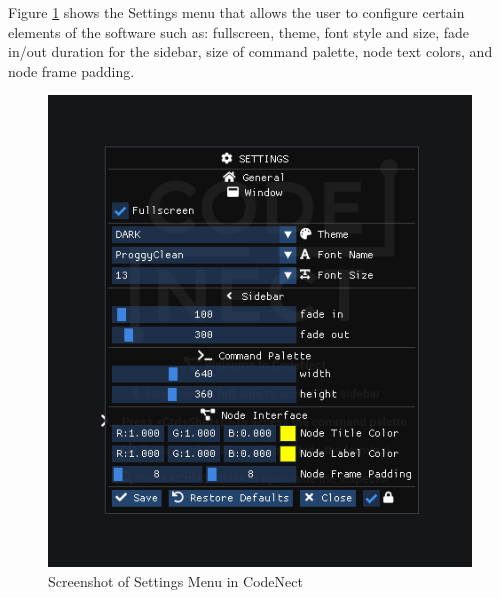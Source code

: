 \parx
Figure \ref{fig:cn_settings} shows the Settings menu that allows the user to configure
certain elements of the software such as: fullscreen, theme, font style and size, fade
in/out duration for the sidebar, size of command palette, node text colors, and
node frame padding.

\begin{figure}[H]
	\centering
	\captionsetup{justification=centering}
	\captionsetup[figure]{list=yes}
	\includegraphics[width=\linewidth]{media/sc_settings.png}
	\caption[Screenshot of Settings Menu in CodeNect]{Screenshot of Settings Menu in CodeNect}
	\label{fig:cn_settings}
\end{figure}
